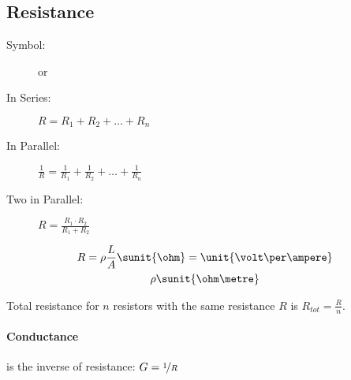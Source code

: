 
\subsection{Resistance} %
	\begin{description}
		\item[Symbol:] 
		or
		\item[In Series:] $R = R_1 + R_2 + \dots + R_n$
		\item[In Parallel:] $\displaystyle \frac{1}{R} = \frac{1}{R_1} + \frac{1}{R_2} + \dots + \frac{1}{R_n}$
		\item[Two in Parallel:] $\displaystyle R = \frac{R_1\cdot R_2}{R_1 + R_2}$
	\end{description}
	\begin{gather*}
		R = \rho \frac{L}{A} \sunit{\ohm} = \unit{\volt\per\ampere} \\
		\rho \sunit{\ohm\metre}
	\end{gather*}
	
	Total resistance for $n$ resistors with the same resistance $R$ is $R_{tot} = \frac{R}{n}$.
	
	\paragraph{Conductance} %
		is the inverse of resistance:
		$
			G = \nicefrac{1}{R}
		$
	
